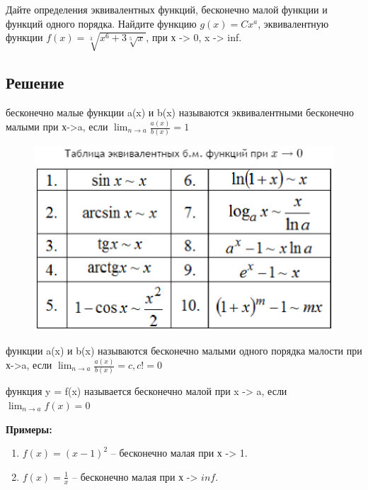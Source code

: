 Дайте определения эквивалентных функций, бесконечно малой функции и функций одного порядка. Найдите функцию $g(x) = Cx^a$, эквивалентную функции $f(x)= \sqrt[3]{x^6+3\sqrt[5]{x}}$, при х -> 0, x -> inf.

\subsection*{Решение}

\begin{defi} бесконечно малые функции a(x) и b(x) называются эквивалентными бесконечно малыми при х->a, если
$\displaystyle \lim_{n\rightarrow a}
               \frac{a(x)}{b(x)}
               =1
$ 
\end{defi}
\begin{figure}[h!]
\includegraphics[width=1\linewidth]{_PNG}
\end{figure}
\clearpage
\begin{defi}  функции a(x) и b(x) называются бесконечно малыми одного порядка малости при х->a, если
$\displaystyle \lim_{n\rightarrow a} 
               \frac{a(x)}{b(x)}
               =c, c != 0
$              

\end{defi}
\begin{defi} функция y = f(x) называется бесконечно малой при x -> a, если
$\displaystyle \lim_{n\rightarrow a} 
               f(x) = 0
$
             
\end{defi}

\textbf{Примеры:}
    \begin{enumerate}
        \item $f(x) = (x-1)^2$ -- бесконечно малая при х -> 1.
         \item $f(x) = \frac{1}{x}$ -- бесконечно малая при х -> $inf$.
    \end{enumerate}


